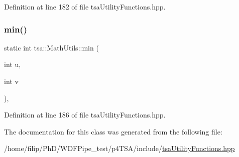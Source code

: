 Definition at line 182 of file tsa\+Utility\+Functions.\+hpp.

\mbox{\label{classtsa_1_1_math_utils_a00386ddcb986eea58d68e5fb2e4bd9f1}} 
\subsubsection{\texorpdfstring{min()}{min()}}
{\footnotesize\ttfamily static int tsa\+::\+Math\+Utils\+::min (\begin{DoxyParamCaption}\item[{int}]{u,  }\item[{int}]{v }\end{DoxyParamCaption})\hspace{0.3cm}{\ttfamily [inline]}, {\ttfamily [static]}}



Definition at line 186 of file tsa\+Utility\+Functions.\+hpp.



The documentation for this class was generated from the following file\+:\begin{DoxyCompactItemize}
\item 
/home/filip/\+Ph\+D/\+W\+D\+F\+Pipe\+\_\+test/p4\+T\+S\+A/include/\hyperlink{tsa_utility_functions_8hpp}{tsa\+Utility\+Functions.\+hpp}\end{DoxyCompactItemize}
